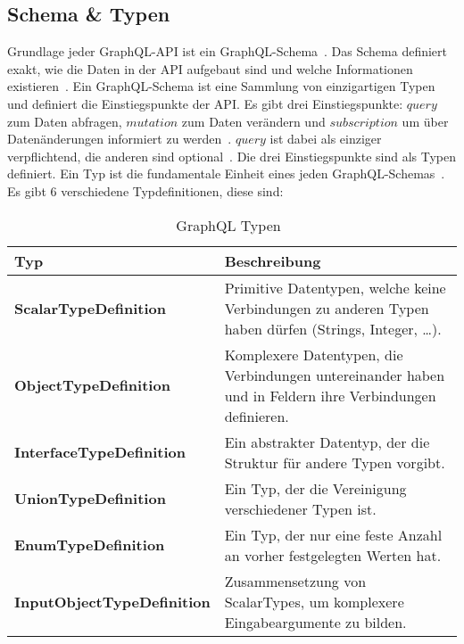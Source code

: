 \subsection{Schema \& Typen}
\label{schematypes}

Grundlage jeder GraphQL-API ist ein GraphQL-Schema~\cite[vgl. Core Concepts]{graphqlspecification}.
Das Schema definiert exakt, wie die Daten in der API aufgebaut sind und welche Informationen existieren~\cite[vgl. 3.2 Schema]{graphqlspecification}.
Ein GraphQL-Schema ist eine Sammlung von einzigartigen Typen und definiert die Einstiegspunkte der API.
Es gibt drei Einstiegspunkte: $query$ zum Daten abfragen, $mutation$ zum Daten verändern und $subscription$ um über Datenänderungen informiert zu werden~\cite[vgl. 3.2.1 Root Operation Types]{graphqlspecification}.
$query$ ist dabei als einziger verpflichtend, die anderen sind optional~\cite[vgl. 3.2.1]{graphqlspecification}.
Die drei Einstiegspunkte sind als Typen definiert.
Ein Typ ist die fundamentale Einheit eines jeden GraphQL-Schemas~\cite[vgl. 3.4 Types]{graphqlspecification}.
\newpage
Es gibt 6 verschiedene Typdefinitionen, diese sind:

\begin{center}
    \begin{table}[!ht]
        \begin{tabularx}{\textwidth}{|C|C|}
            \hline
            \textbf{ Typ } & \textbf{ Beschreibung} \\
            \hline
            \textbf{ ScalarTypeDefinition } & Primitive Datentypen, welche keine Verbindungen zu anderen Typen haben dürfen (Strings, Integer, \ldots). \\
            \hline
            \textbf{ ObjectTypeDefinition  } & Komplexere Datentypen, die Verbindungen untereinander haben und in Feldern ihre Verbindungen definieren. \\
            \hline
            \textbf{ InterfaceTypeDefinition } & Ein abstrakter Datentyp, der die Struktur für andere Typen vorgibt. \\
            \hline
            \textbf{ UnionTypeDefinition } & Ein Typ, der die Vereinigung verschiedener Typen ist. \\
            \hline
            \textbf{ EnumTypeDefinition } & Ein Typ, der nur eine feste Anzahl an vorher festgelegten Werten hat. \\
            \hline
            \textbf{ InputObjectTypeDefinition } & Zusammensetzung von ScalarTypes, um komplexere Eingabeargumente zu bilden.  \\
            \hline
        \end{tabularx}
        \caption{GraphQL Typen~\cite[vgl. 3.4 Types]{graphqlspecification}}
    \end{table}
\end{center}

